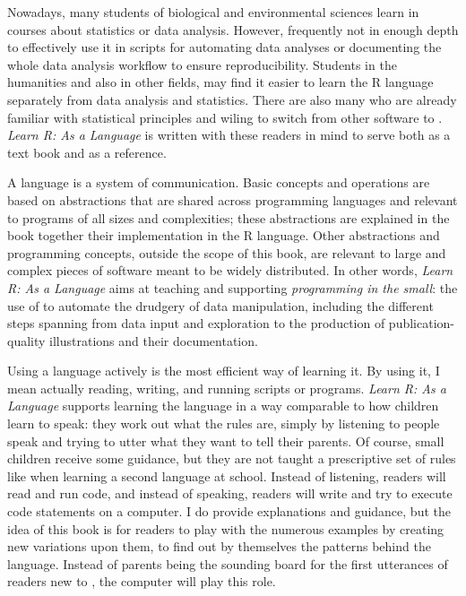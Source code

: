 \documentclass[krantz2]{krantz}\usepackage{knitr}
\begin{document}
Nowadays, many students of biological and environmental sciences learn \Rlang in courses about statistics or data analysis. However, frequently not in enough depth to effectively use it in scripts for automating data analyses or documenting the whole data analysis workflow to ensure reproducibility. Students in the humanities and also in other fields, may find it easier to learn the R language separately from data analysis and statistics. There are also many who are already familiar with statistical principles and wiling to switch from other software to \Rlang. \emph{Learn R: As a Language} is written with these readers in mind to serve both as a text book and as a reference.

A language is a system of communication. Basic concepts and operations are based on abstractions that are shared across programming languages and relevant to programs of all sizes and complexities; these abstractions are explained in the book together their implementation in the R language. Other abstractions and programming concepts, outside the scope of this book, are relevant to large and complex pieces of software meant to be widely distributed. In other words, \emph{Learn R: As a Language} aims at teaching and supporting \emph{programming in the small}: the use of \Rlang to automate the drudgery of data manipulation, including the different steps spanning from data input and exploration to the production of publication-quality illustrations and their documentation.

Using a language actively is the most efficient way of learning it. By using it, I mean actually reading, writing, and running scripts or programs. \emph{Learn R: As a Language} supports learning the \Rlang language in a way comparable to how children learn to speak: they work out what the rules are, simply by listening to people speak and trying to utter what they want to tell their parents. Of course, small children receive some guidance, but they are not taught a prescriptive set of rules like when learning a second language at school. Instead of listening, readers will read and run code, and instead of speaking, readers will write and try to execute \Rlang code statements on a computer. I do provide explanations and guidance, but the idea of this book is for readers to play with the numerous examples by creating new variations upon them, to find out by themselves the patterns behind the \Rlang language. Instead of parents being the sounding board for the first utterances of readers new to \Rlang, the computer will play this role.
\end{document}
